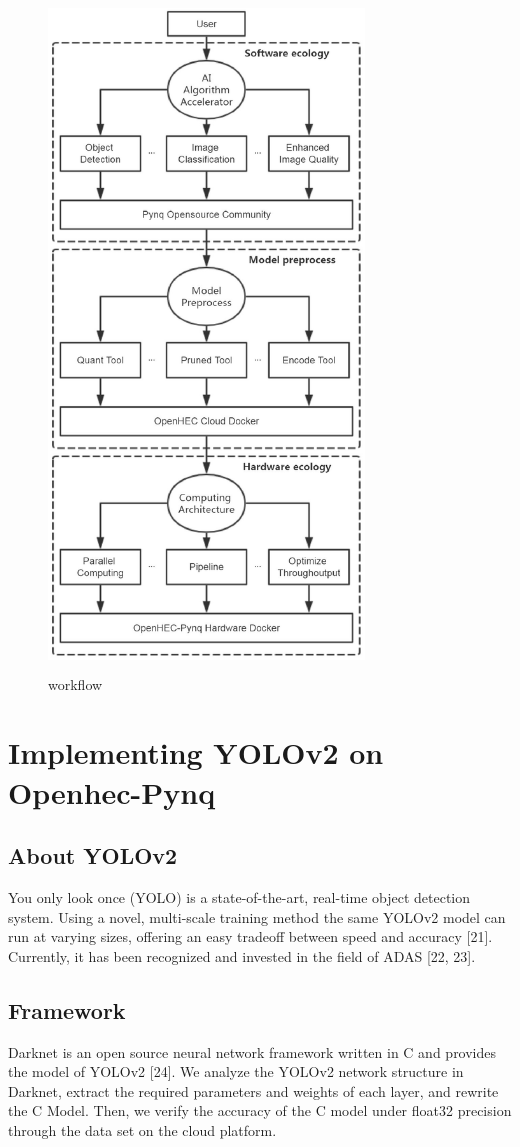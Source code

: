 \begin{figure}
\includegraphics[height=7in, width=3.3in]{figure_0}
\caption{workflow}
\end{figure}

\section{Implementing YOLOv2 on Openhec-Pynq}
\subsection{About YOLOv2}
You only look once (YOLO) is a state-of-the-art, real-time object detection system. Using a novel, multi-scale training method the same YOLOv2 model can run at varying sizes, offering an easy tradeoff between speed and accuracy [21]. Currently, it has been recognized and invested in the field of ADAS [22, 23].

\subsection{Framework}
Darknet is an open source neural network framework written in C and provides the model of YOLOv2 [24]. We analyze the YOLOv2 network structure in Darknet, extract the required parameters and weights of each layer, and rewrite the C Model. Then, we verify the accuracy of the C model under float32 precision through the data set on the cloud platform.

